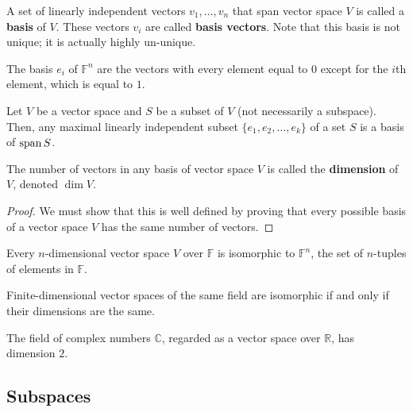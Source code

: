   \begin{definition}[Basis]
    A set of linearly independent vectors $v_1, \ldots, v_n$ that span vector space $V$ is called a \textbf{basis} of $V$. These vectors $v_i$ are called \textbf{basis vectors}. Note that this basis is not unique; it is actually highly un-unique. 
  \end{definition}

  \begin{example}
    The basis $e_i$ of $\mathbb{F}^n$ are the vectors with every element equal to $0$ except for the $i$th element, which is equal to $1$. 
  \end{example}

  \begin{theorem}
    Let $V$ be a vector space and $S$ be a subset of $V$ (not necessarily a subspace). Then, any maximal linearly independent subset $\{ e_1, e_2, \ldots, e_k\}$ of a set $S$ is a basis of $\operatorname{span} S$. 
  \end{theorem}

  \begin{definition}[Dimension]
    The number of vectors in any basis of vector space $V$ is called the \textbf{dimension} of $V$, denoted $\dim{V}$. 
  \end{definition}
  \begin{proof}
    We must show that this is well defined by proving that every possible basis of a vector space $V$ has the same number of vectors.
  \end{proof}

  \begin{theorem}
    Every $n$-dimensional vector space $V$ over $\mathbb{F}$ is isomorphic to $\mathbb{F}^n$, the set of $n$-tuples of elements in $\mathbb{F}$. 
  \end{theorem}

  \begin{corollary}
    Finite-dimensional vector spaces of the same field are isomorphic if and only if their dimensions are the same. 
  \end{corollary}

  \begin{example}
    The field of complex numbers $\mathbb{C}$, regarded as a vector space over $\mathbb{R}$, has dimension $2$. 
  \end{example}

\subsection{Subspaces}

